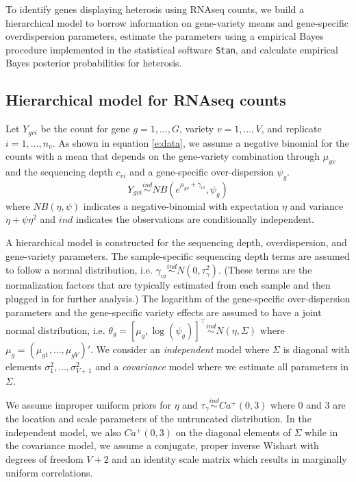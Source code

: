 \documentclass[useAMS,usenatbib,referee]{biom}
\begin{document}
To identify genes displaying heterosis using RNAseq counts, we build a hierarchical model to borrow information on gene-variety means and gene-specific overdispersion parameters, estimate the parameters using a empirical Bayes procedure implemented in the statistical software {\tt Stan}, and calculate empirical Bayes posterior probabilities for heterosis. 


\subsection{Hierarchical model for RNAseq counts}
\label{s:model}

Let $Y_{gvi}$ be the count for gene $g=1,\ldots,G$, variety $v=1,\ldots,V$, and replicate $i=1,\ldots,n_v$. As shown in equation \eqref{e:data}, we assume a negative binomial for the counts with a mean that depends on the gene-variety combination through $\mu_{gv}$ and the sequencing depth $c_{vi}$ and a gene-specific over-dispersion $\psi_g$. 
\begin{equation} 
Y_{gvi} \stackrel{ind}{\sim} NB(e^{\mu_{gv}+\gamma_{vi}},\psi_g) 
\label{e:data}
\end{equation}
where $NB(\eta,\psi)$ indicates a negative-binomial with expectation $\eta$ and variance $\eta+\psi\eta^2$ and $ind$ indicates the observations are conditionally independent.

A hierarchical model is constructed for the sequencing depth, overdispersion, and gene-variety parameters. The sample-specific sequencing depth terms are assumed to follow a normal distribution, i.e. $\gamma_{vi} \stackrel{ind}{\sim} N(0,\tau_\gamma^2)$. (These terms are the normalization factors that are typically estimated from each sample and then plugged in for further analysis.) The logarithm of the gene-specific over-dispersion parameters and the gene-specific variety effects are assumed to have a joint normal distribution, i.e. 
$\theta_g = [\mu_g, \log(\psi_g)]^\top \stackrel{ind}{\sim} N\left(\eta, \Sigma\right)$
where $\mu_g = (\mu_{g1},\ldots,\mu_{gV})'$. We consider an \emph{independent} model where $\Sigma$ is diagonal with elements $\sigma_1^2,\ldots,\sigma_{V+1}^2$ and a \emph{covariance} model where we estimate all parameters in $\Sigma$. 

We assume improper uniform priors for $\eta$ and $\tau_\gamma\stackrel{ind}{\sim} Ca^+(0,3)$ where 0 and 3 are the location and scale parameters of the untruncated distribution. In the independent model, we also $Ca^+(0,3)$ on the diagonal elements of $\Sigma$ while in the covariance model, we assume a conjugate, proper inverse Wishart with degrees of freedom $V+2$ and an identity scale matrix which results in marginally uniform correlations. 
\end{document}
